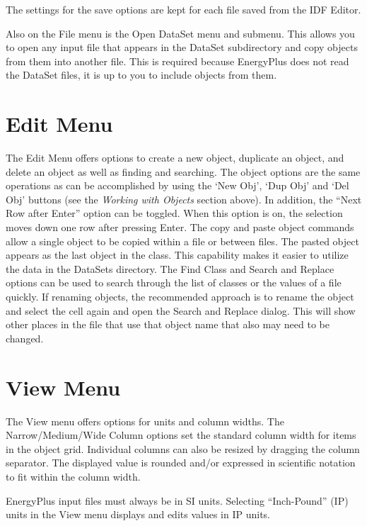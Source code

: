 The settings for the save options are kept for each file saved from the IDF Editor.

Also on the File menu is the Open DataSet menu and submenu. This allows you to open any input file that appears in the DataSet subdirectory and copy objects from them into another file. This is required because EnergyPlus does not read the DataSet files, it is up to you to include objects from them.

\section{Edit Menu}\label{edit-menu-000}

The Edit Menu offers options to create a new object, duplicate an object, and delete an object as well as finding and searching. The object options are the same operations as can be accomplished by using the `New Obj', `Dup Obj' and `Del Obj' buttons (see the \emph{Working with Objects} section above). In addition, the ``Next Row after Enter'' option can be toggled. When this option is on, the selection moves down one row after pressing Enter. The copy and paste object commands allow a single object to be copied within a file or between files. The pasted object appears as the last object in the class. This capability makes it easier to utilize the data in the DataSets directory. The Find Class and Search and Replace options can be used to search through the list of classes or the values of a file quickly. If renaming objects, the recommended approach is to rename the object and select the cell again and open the Search and Replace dialog. This will show other places in the file that use that object name that also may need to be changed.

\section{View Menu}\label{view-menu-000}

The View menu offers options for units and column widths. The Narrow/Medium/Wide Column options set the standard column width for items in the object grid. Individual columns can also be resized by dragging the column separator. The displayed value is rounded and/or expressed in scientific notation to fit within the column width.

EnergyPlus input files must always be in SI units. Selecting ``Inch-Pound'' (IP) units in the View menu displays and edits values in IP units.

